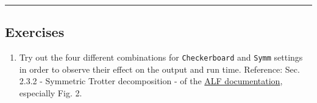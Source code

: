     \begin{center}\rule{0.5\linewidth}{0.5pt}\end{center}

\hypertarget{exercises}{%
\subsection{Exercises}\label{exercises}}

\begin{enumerate}
\def\labelenumi{\arabic{enumi}.}
\tightlist
\item
  Try out the four different combinations for \texttt{Checkerboard} and
  \texttt{Symm} settings in order to observe their effect on the output
  and run time. Reference: Sec. 2.3.2 - Symmetric Trotter decomposition
  - of the
  \href{https://git.physik.uni-wuerzburg.de/ALF/ALF/-/blob/master/Documentation/doc.pdf}{ALF
  documentation}, especially Fig. 2.
\end{enumerate}


    
    
    
